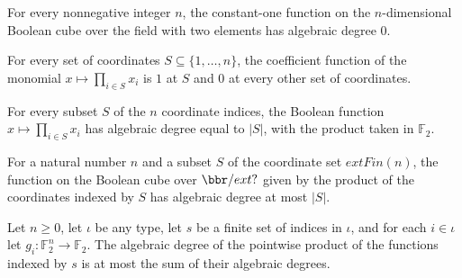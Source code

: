 \begin{theorem}
\label{FABL.functionAlgebraicDegree_one}
\leanok
{}
For every nonnegative integer $n$, the constant-one function on the $n$-dimensional
Boolean cube over the field with two elements has algebraic degree $0$.
\end{theorem}

\begin{theorem}
\label{FABL.anfCoeff_anfMonomial}
\leanok
{}
For every set of coordinates $S\subseteq\{1,\ldots,n\}$, the coefficient function of the
monomial $x\mapsto\prod_{i\in S}x_i$ is $1$ at $S$ and $0$ at every other set of
coordinates.
\end{theorem}

\begin{theorem}
\label{FABL.functionAlgebraicDegree_anfMonomial}
\leanok
{}
For every subset $S$ of the $n$ coordinate indices, the Boolean function
$x\mapsto\prod_{i\in S}x_i$ has algebraic degree equal to $|S|$, with the product taken
in $\mathbb{F}_2$.
\end{theorem}

\begin{theorem}
\label{FABL.functionAlgebraicDegree_anfMonomial_le_card}
\leanok
{}
For a natural number $n$ and a subset $S$ of the coordinate set $	ext{Fin}(n)$, the
function on the Boolean cube over $\bbr/	ext{?}$ given by the product of the coordinates
indexed by $S$ has algebraic degree at most $|S|$.
\end{theorem}

\begin{theorem}
\label{FABL.functionAlgebraicDegree_finset_prod_le}
\leanok
{}
Let $n\ge 0$, let $\iota$ be any type, let $s$ be a finite set of indices in $\iota$,
and for each $i\in\iota$ let $g_i:\mathbb{F}_2^n\to\mathbb{F}_2$. The algebraic degree
of the pointwise product of the functions indexed by $s$ is at most the sum of their
algebraic degrees.
\end{theorem}

